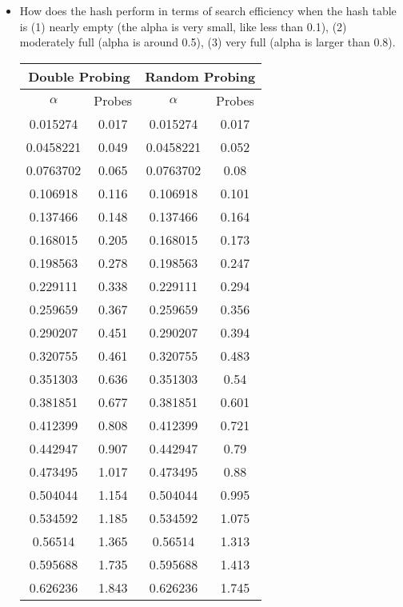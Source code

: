 \documentclass{article}
\begin{document}
\begin{itemize}
\item How does the hash perform in terms of search efficiency when the hash
  table is (1) nearly empty (the alpha is very small, like less than
  0.1),  (2) moderately full (alpha is around 0.5),  (3) very full
  (alpha is larger than 0.8). 

\begin{table}[H]
  \begin{center}
    \begin{tabular}{c|c|c|c} 
      \hline
      \multicolumn{2}{c}{Double Probing} &
      \multicolumn{2}{c}{Random Probing} \\
      \hline
      $\alpha$ & Probes & $\alpha$ & Probes \\
      \hline
      0.015274 & 0.017 & 0.015274 & 0.017 \\
      0.0458221 & 0.049 & 0.0458221 & 0.052 \\
      0.0763702 & 0.065	& 0.0763702 & 0.08 \\
      0.106918 & 0.116 & 0.106918 & 0.101 \\
      0.137466 & 0.148 & 0.137466 & 0.164 \\
      0.168015 & 0.205 & 0.168015 & 0.173 \\
      0.198563 & 0.278 & 0.198563 & 0.247 \\
      0.229111 & 0.338 & 0.229111 & 0.294 \\
      0.259659 & 0.367 & 0.259659 & 0.356 \\
      0.290207 & 0.451 & 0.290207 & 0.394 \\
      0.320755 & 0.461 & 0.320755 & 0.483 \\
      0.351303 & 0.636 & 0.351303 & 0.54 \\
      0.381851 & 0.677 & 0.381851 & 0.601 \\
      0.412399 & 0.808 & 0.412399 & 0.721 \\
      0.442947 & 0.907 & 0.442947 & 0.79 \\
      0.473495 & 1.017 & 0.473495 & 0.88 \\
      0.504044 & 1.154 & 0.504044 & 0.995 \\
      0.534592 & 1.185 & 0.534592 & 1.075 \\
      0.56514 & 1.365 & 0.56514 & 1.313 \\
      0.595688 & 1.735 & 0.595688 & 1.413 \\
      0.626236 & 1.843 & 0.626236 & 1.745 \\

\end{tabular}
\end{center}
\end{table}
\end{itemize}
\end{document}
